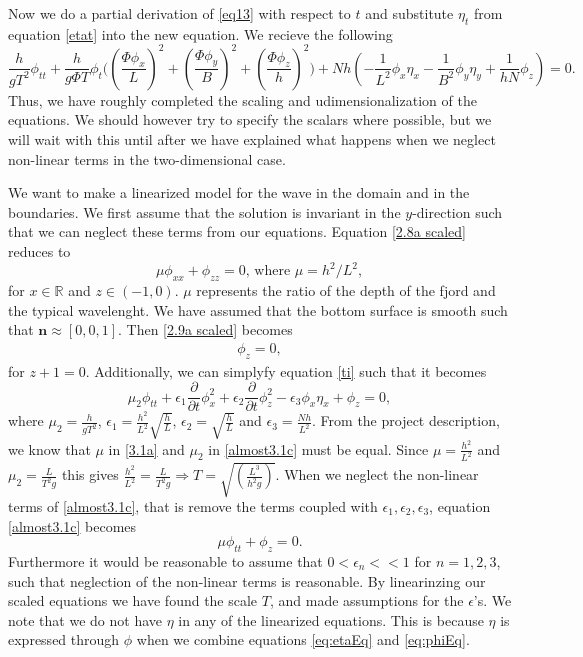 \documentclass[11pt]{article}
\begin{document}
Now we do a partial derivation of \eqref{eq13} with respect to $t$ and substitute $\eta_t$ from equation \eqref{etat} into the new equation. We recieve the following
\begin{equation} \label{ti}
\frac{ h}{ g T^2 } \phi_{tt}+ \frac{h}{g \Phi T} \phi_t\Big((\frac{\Phi \phi_x}{L})^2+(\frac{\Phi \phi_y}{B})^2+(\frac{\Phi \phi_z}{h})^2\Big) + Nh(-\frac{1}{L^2} \phi_x  \eta_x - \frac{1}{B^2} \phi_y \eta_y + \frac{1}{hN} \phi_z ) = 0.
\end{equation}
Thus, we have roughly completed the scaling and udimensionalization of the equations. We should however try to specify the scalars where possible, but we will wait with this until after we have explained what happens when we neglect non-linear terms in the two-dimensional case.


We want to make a linearized model for the wave in the domain and in the boundaries. We first assume that the solution is invariant in the $y$-direction such that we can neglect these terms from our equations. Equation \eqref{2.8a scaled} reduces to 
\begin{equation} \label{3.1a}
\mu \phi_{xx} + \phi_{zz} = 0\text{, where }\mu = h^2/L^2,
\end{equation}
for $x \in \mathbb{R}$ and $z \in (-1,0)$. $\mu$ represents the ratio of the depth of the fjord and the typical wavelenght.  We have assumed that the bottom surface is smooth such that  $\mathbf{n} \approx [0,0,1]$. Then \eqref{2.9a scaled} becomes
\begin{align*}
\phi_z = 0,
\end{align*}
for $z +1 = 0$.
Additionally, we can simplyfy equation \eqref{ti} such that it becomes
\begin{equation} \label{almost3.1c}
\mu_2 \phi_{tt} + \epsilon_1 \frac{\partial }{\partial t} \phi_x^2+ \epsilon_2 \frac{\partial }{\partial t}\phi_z^2 - \epsilon_3 \phi_x  \eta_x +  \phi_z  = 0,
\end{equation}
where $\mu_2=\frac{h}{gT^2}$, $\epsilon_1= \frac{h^2}{L^2} \sqrt{\frac{h}{L}}$, $\epsilon_2=\sqrt{\frac{h}{L}}$ and $\epsilon_3=\frac{Nh}{L^2}$.
From the project description, we know that $\mu$ in \eqref{3.1a} and $\mu_2$ in \eqref{almost3.1c} must be equal. Since $\mu=\frac{h^2}{L^2}$ and $\mu_2=\frac{L}{T^2g}$ this gives $\frac{h^2}{L^2}=\frac{L}{T^2g} \Rightarrow T=\sqrt{(\frac{L^3}{h^2g})}$.
When we neglect the non-linear terms of \eqref{almost3.1c}, that is remove the terms coupled with $\epsilon_1, \epsilon_2, \epsilon_3$, equation \eqref{almost3.1c} becomes
\begin{equation*}
\mu \phi_{tt}+ \phi_z=0.
\end{equation*}
Furthermore it would be reasonable to assume that $0<\epsilon_n<<1$ for $n=1,2,3$, such that neglection of the non-linear terms is reasonable. By linearinzing our scaled equations we have found the scale $T$, and made assumptions for the $\epsilon$'s. We note that we do not have $\eta$ in any of the linearized equations. This is because $\eta$ is expressed through $\phi$ when we combine equations \eqref{eq:etaEq} and \eqref{eq:phiEq}.
\end{document}
